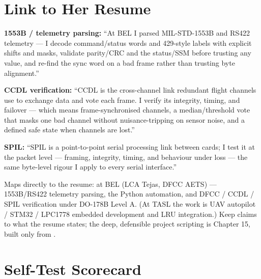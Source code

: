 \section{Link to Her Resume}

\begin{resumelink}
\textbf{1553B / telemetry parsing:} ``At BEL I parsed MIL-STD-1553B and RS422
telemetry --- I decode command/status words and 429-style labels with explicit
shifts and masks, validate parity/CRC and the status/SSM before trusting any
value, and re-find the sync word on a bad frame rather than trusting byte
alignment.''

\medskip
\textbf{CCDL verification:} ``CCDL is the cross-channel link redundant flight
channels use to exchange data and vote each frame. I verify its integrity,
timing, and failover --- which means frame-synchronised channels, a
median/threshold vote that masks one bad channel without nuisance-tripping on
sensor noise, and a defined safe state when channels are lost.''

\medskip
\textbf{SPIL:} ``SPIL is a point-to-point serial processing link between cards;
I test it at the packet level --- framing, integrity, timing, and behaviour
under loss --- the same byte-level rigour I apply to every serial interface.''

\medskip
\small Maps directly to the resume: at BEL (LCA Tejas, DFCC AETS) --- 1553B/RS422
telemetry parsing, the Python automation, and DFCC / CCDL / SPIL verification
under DO-178B Level A. (At TASL the work is UAV autopilot / STM32 / LPC1778
embedded development and LRU integration.) Keep claims to what the resume states;
the deep, defensible project scripting is Chapter 15, built only from
.
\end{resumelink}

\section{Self-Test Scorecard}


